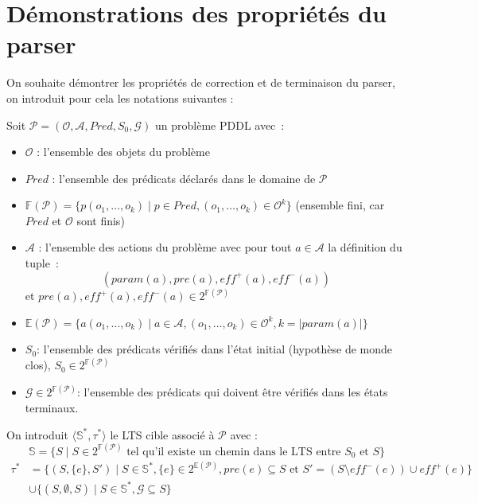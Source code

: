 

\section{Démonstrations des propriétés du parser}

On souhaite démontrer les propriétés de correction et de terminaison du parser, on introduit pour cela les notations suivantes :

Soit $\mathcal{P} = (\mathcal{O}, \mathcal{A}, Pred, S_0, \mathcal{G})$ un problème PDDL avec :
\begin{itemize}
    \item $\mathcal{O}$ : l'ensemble des objets du problème
    \item $Pred$ : l'ensemble des prédicats déclarés dans le domaine de $\mathcal{P}$
    \item $\mathds{F}(\mathcal{P}) = \{ p(o_1,\dots,o_k) \mid p\in Pred, (o_1, \dots,o_k) \in \mathcal{O}^k \}$ (ensemble fini, car $Pred$ et $\mathcal{O}$ sont finis)
    \item $\mathcal{A}$ : l'ensemble des actions du problème avec pour tout $a\in \mathcal{A}$ la définition du tuple :  $$(param(a),pre(a),eff^+(a),eff^-(a))$$
    et $pre(a),eff^+(a),eff^-(a) \in 2^{\mathds{F}(\mathcal{P})}$
    \item $\mathds{E}(\mathcal{P}) = \{ a(o_1,\dots, o_k) \mid a \in \mathcal{A}, (o_1, \dots,o_k) \in \mathcal{O}^k, k = \lvert param(a) \rvert \}$
    \item $S_0$: l'ensemble des prédicats vérifiés dans l'état initial (hypothèse de monde clos), $S_0 \in 2^{\mathds{F}(\mathcal{P})}$
    \item $\mathcal{G} \in 2^{\mathds{F}(\mathcal{P})} $: l'ensemble des prédicats qui doivent être vérifiés dans les états terminaux.
\end{itemize}

On introduit $\langle \mathds{S}^*, \tau^*\rangle$ le LTS cible associé à $\mathcal{P}$ avec : 
$$\mathds{S} = \{S  \mid S \in 2^{\mathds{F}(\mathcal{P})} \text{ tel qu'il existe un chemin dans le LTS entre } S_0 \text{ et }S\}$$
\begin{equation*}
    \begin{aligned}
    \tau^* &= \{(S, \{e\}, S') \mid S \in \mathbb{S}^*, \{e\} \in 2^{\mathds{E}(\mathcal{P})}, pre(e) \subseteq S \text{ et } S' = (S \setminus eff^-(e)) \cup eff^+(e)\} \\
    &\cup \{(S, \emptyset, S) \mid S \in \mathbb{S}^*, \mathcal{G} \subseteq S\}
    \end{aligned}
\end{equation*}

